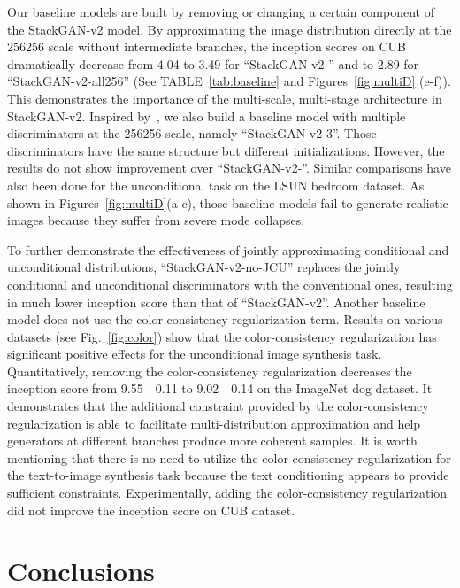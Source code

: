 \documentclass[10pt,journal,letterpaper,compsoc]{IEEEtran}
\begin{document}
Our baseline models are built by removing or changing a certain component of the StackGAN-v2 model. By approximating the image distribution directly at the 256256 scale without intermediate branches, the inception scores on CUB dramatically decrease from 4.04 to 3.49 for  ``StackGAN-v2-'' and to 2.89 for ``StackGAN-v2-all256'' (See TABLE~\ref{tab:baseline} and Figures~\ref{fig:multiD} (e-f)). This demonstrates the importance of the multi-scale, multi-stage architecture in StackGAN-v2. Inspired by~\cite{DurugkarGM17}, we also build a baseline model with multiple discriminators at the 256256 scale, namely ``StackGAN-v2-3''. Those discriminators have the same structure but different initializations. However, the results do not show improvement over ``StackGAN-v2-''. Similar comparisons have also been done for the unconditional task on the LSUN bedroom dataset. As shown in Figures~\ref{fig:multiD}(a-c), those baseline models fail to generate realistic images because they suffer from severe mode collapses. 


To further demonstrate the effectiveness of jointly approximating conditional and unconditional distributions, ``StackGAN-v2-no-JCU'' replaces the jointly conditional and unconditional discriminators with the conventional ones,  resulting in much lower inception score than that of ``StackGAN-v2''. Another baseline model does not use the color-consistency regularization term.  Results on various datasets (see Fig.~\ref{fig:color}) show that the color-consistency regularization has significant positive effects for the unconditional image synthesis task. Quantitatively, removing the color-consistency regularization decreases the inception score from 9.55~~0.11 to 9.02~~0.14 on the ImageNet dog dataset. It demonstrates that the additional
constraint provided by the color-consistency regularization is able to facilitate multi-distribution approximation and help generators at different branches produce more coherent samples. It is worth mentioning that there is no need to utilize the color-consistency regularization for the text-to-image synthesis task because the text conditioning appears to provide sufficient constraints. Experimentally, adding the color-consistency regularization did not improve the inception score on CUB dataset. 






\section{Conclusions}\label{sec:conclusion}
\end{document}
